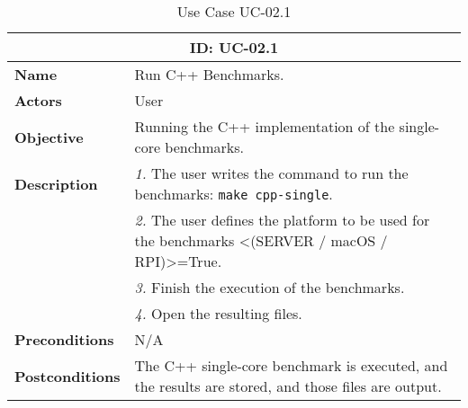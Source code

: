 \begin{table}[H]
    \centering
    \begin{tabular}{l p{10cm}}
        \toprule
        \multicolumn{2}{c}{\textbf{ID: UC-02.1}} \\
        \toprule
        \textbf{Name}                         &  Run C++ Benchmarks. \\
        \textbf{Actors}                       &  User \\
        \textbf{Objective}                    &  Running the C++ implementation of the single-core benchmarks. \\
        \multirow{1}{*}{\textbf{Description}} & \textsl{1.} The user writes the command to run the benchmarks: \texttt{make cpp-single}.\\
                                              & \textsl{2.} The user defines the platform to be used for the benchmarks <(SERVER / macOS / RPI)>=True.\\
                                              & \textsl{3.} Finish the execution of the benchmarks.\\
                                              & \textsl{4.} Open the resulting files.\\
        \textbf{Preconditions}                &  N/A \\
        \textbf{Postconditions}               &  The C++ single-core benchmark is executed, and the results are stored, and those files are output. \\
    \end{tabular}
    \caption{Use Case UC-02.1}
    \label{tab:uc-02.1}
\end{table}

